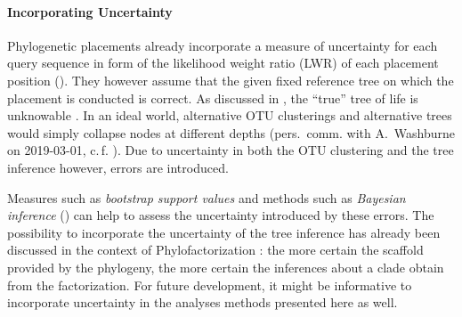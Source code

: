 \paragraph{Incorporating Uncertainty}
\label{ch:ConclusionOutlook:sec:AnalysisMethods:par:Uncertainty}


Phylogenetic placements already incorporate a measure of uncertainty for each query sequence
in form of the likelihood weight ratio (LWR) of each placement position
().
They however assume that the given fixed reference tree on which the placement is conducted is correct.
As discussed in ,
the ``true'' tree of life is unknowable \cite{Haber2005}.
In an ideal world, alternative OTU clusterings and alternative trees would simply collapse nodes at different depths
(pers.~comm. with A.~Washburne on 2019-03-01, c.\,f. ).
Due to uncertainty in both the OTU clustering and the tree inference however, errors are introduced.

Measures such as \emph{bootstrap support values} \cite{Efron1979,Felsenstein1985a,Soltis2003}
and methods such as \emph{Bayesian inference} ()
can help to assess the uncertainty introduced by these errors.
The possibility to incorporate the uncertainty of the tree inference
has already been discussed in the context of Phylofactorization \cite{Washburne2019}:
the more certain the scaffold provided by the phylogeny,
the more certain the inferences about a clade obtain from the factorization.
For future development, it might be informative to incorporate uncertainty in the analyses methods presented here as well.



